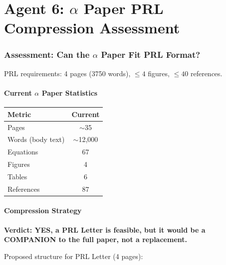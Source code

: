 \documentclass[11pt,a4paper]{article}
\begin{document}
\part{Agent 6: $\alpha$ Paper PRL Compression Assessment}
\label{part:prl}

\section{Assessment: Can the $\alpha$ Paper Fit PRL Format?}

PRL requirements: 4 pages (3750 words), $\leq 4$ figures, $\leq 40$ references.

\subsection{Current $\alpha$ Paper Statistics}

\begin{center}
\begin{tabular}{lc}
\toprule
\textbf{Metric} & \textbf{Current} \\
\midrule
Pages & $\sim$35 \\
Words (body text) & $\sim$12{,}000 \\
Equations & 67 \\
Figures & 4 \\
Tables & 6 \\
References & 87 \\
\bottomrule
\end{tabular}
\end{center}

\subsection{Compression Strategy}

\textbf{Verdict: YES, a PRL Letter is feasible, but it would be a COMPANION to the full paper, not a replacement.}

Proposed structure for PRL Letter (4 pages):
\end{document}
